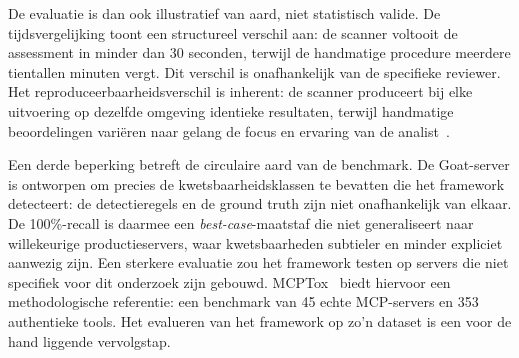 De evaluatie is dan ook illustratief van aard, niet statistisch valide. De tijdsvergelijking toont een structureel verschil aan: de scanner voltooit de assessment in minder dan 30 seconden, terwijl de handmatige procedure meerdere tientallen minuten vergt. Dit verschil is onafhankelijk van de specifieke reviewer. Het reproduceerbaarheidsverschil is inherent: de scanner produceert bij elke uitvoering op dezelfde omgeving identieke resultaten, terwijl handmatige beoordelingen variëren naar gelang de focus en ervaring van de analist~\autocite{chess2004static}.

Een derde beperking betreft de circulaire aard van de benchmark. De Goat-server is ontworpen om precies de kwetsbaarheidsklassen te bevatten die het framework detecteert: de detectieregels en de ground truth zijn niet onafhankelijk van elkaar. De 100\%-recall is daarmee een \emph{best-case}-maatstaf die niet generaliseert naar willekeurige productieservers, waar kwetsbaarheden subtieler en minder expliciet aanwezig zijn. Een sterkere evaluatie zou het framework testen op servers die niet specifiek voor dit onderzoek zijn gebouwd. MCPTox~\autocite{wang2025mcptox} biedt hiervoor een methodologische referentie: een benchmark van 45 echte MCP-servers en 353 authentieke tools. Het evalueren van het framework op zo'n dataset is een voor de hand liggende vervolgstap.
